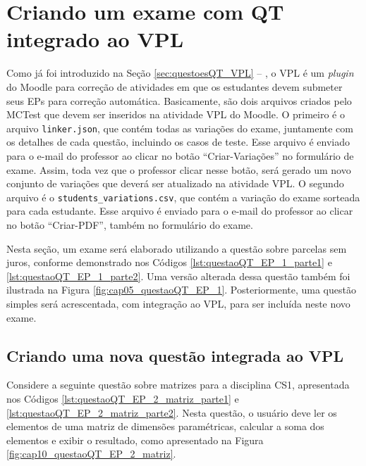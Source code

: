 \section{Criando um exame com QT integrado ao VPL}

Como já foi introduzido na Seção \ref{sec:questoesQT_VPL} -- , o VPL é um \textit{plugin} do Moodle para correção de atividades em que os estudantes devem submeter seus EPs para correção automática. Basicamente, são dois arquivos criados pelo MCTest que devem ser inseridos na atividade VPL do Moodle. O primeiro é o arquivo \verb|linker.json|, que contém todas as variações do exame, juntamente com os detalhes de cada questão, incluindo os casos de teste. Esse arquivo é enviado para o e-mail do professor ao clicar no botão ``Criar-Variações'' no formulário de exame. Assim, toda vez que o professor clicar nesse botão, será gerado um novo conjunto de variações que deverá ser atualizado na atividade VPL. O segundo arquivo é o \verb|students_variations.csv|, que contém a variação do exame sorteada para cada estudante. Esse arquivo é enviado para o e-mail do professor ao clicar no botão ``Criar-PDF'', também no formulário do exame.

Nesta seção, um exame será elaborado utilizando a questão sobre parcelas sem juros, conforme demonstrado nos Códigos \ref{lst:questaoQT_EP_1_parte1} e \ref{lst:questaoQT_EP_1_parte2}. Uma versão alterada dessa questão também foi ilustrada na Figura \ref{fig:cap05_questaoQT_EP_1}. Posteriormente, uma questão simples será acrescentada, com integração ao VPL, para ser incluída neste novo exame.

\subsection{Criando uma nova questão integrada ao VPL}

Considere a seguinte questão sobre matrizes para a disciplina CS1, apresentada nos Códigos \ref{lst:questaoQT_EP_2_matriz_parte1} e \ref{lst:questaoQT_EP_2_matriz_parte2}. Nesta questão, o usuário deve ler os elementos de uma matriz de dimensões paramétricas, calcular a soma dos elementos e exibir o resultado, como apresentado na Figura \ref{fig:cap10_questaoQT_EP_2_matriz}.

